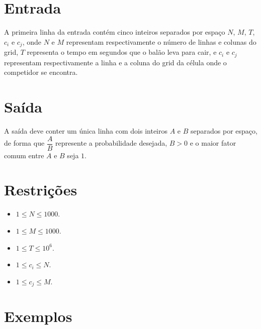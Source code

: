 \section*{Entrada}

A primeira linha da entrada contém cinco inteiros separados por espaço $N$, $M$, $T$, $c_i$ e $c_j$, onde $N$ e $M$ representam respectivamente o
número de linhas e colunas do grid, $T$ representa o tempo em segundos que o balão leva para cair, e $c_i$ e $c_j$ representam respectivamente a linha e a coluna do grid da célula onde o competidor se
encontra.

\section*{Saída}
A saída deve conter um única linha com dois inteiros $A$ e $B$ separados por espaço, de forma que $\dfrac{A}{B}$ represente a probabilidade desejada, $B > 0$ e o maior fator comum entre $A$ e $B$ seja $1$.
\section*{Restrições}

\begin{itemize}
    \item $1 \leq N \leq 1000$.
    \item $1 \leq M \leq 1000$.
    \item $1 \leq T \leq {10}^6$.
    \item $1 \leq c_i \leq N$.
    \item $1 \leq c_j \leq M$.
\end{itemize}


\section*{Exemplos}

\exemplo
